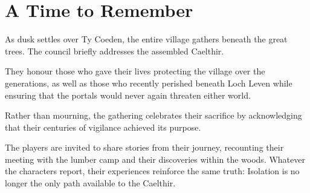 \section*{A Time to Remember}
{\entryfont As dusk settles over Ty Coeden, the entire village gathers beneath the great trees. The council briefly addresses the assembled Caelthir.

They honour those who gave their lives protecting the village over the generations, as well as those who recently perished beneath Loch Leven while ensuring that the portals would never again threaten either world.

Rather than mourning, the gathering celebrates their sacrifice by acknowledging that their centuries of vigilance achieved its purpose.

The players are invited to share stories from their journey, recounting their meeting with the lumber camp and their discoveries within the woods. Whatever the characters report, their experiences reinforce the same truth: Isolation is no longer the only path available to the Caelthir.}